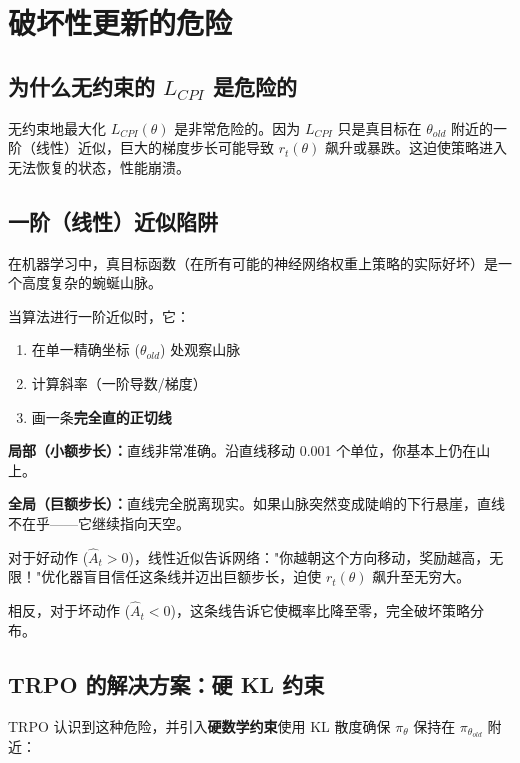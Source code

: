 \documentclass[12pt,a4paper]{article}
\theoremstyle{noteplain}
\theoremstyle{noteexercise}
\begin{document}
\section{破坏性更新的危险}\label{sec:danger}

\subsection{为什么无约束的 $L_{CPI}$ 是危险的}

无约束地最大化 $L_{CPI}(\theta)$ 是非常危险的。因为 $L_{CPI}$ 只是真目标在 $\theta_{old}$ 附近的一阶（线性）近似，巨大的梯度步长可能导致 $r_t(\theta)$ 飙升或暴跌。这迫使策略进入无法恢复的状态，性能崩溃。

\subsection{一阶（线性）近似陷阱}

在机器学习中，真目标函数（在所有可能的神经网络权重上策略的实际好坏）是一个高度复杂的蜿蜒山脉。

当算法进行一阶近似时，它：
\begin{enumerate}
  \setlength{\itemsep}{0.2em}
  \item 在单一精确坐标 ($\theta_{old}$) 处观察山脉
  \item 计算斜率（一阶导数/梯度）
  \item 画一条\textbf{完全直的正切线}
\end{enumerate}

\textbf{局部（小额步长）：}直线非常准确。沿直线移动 0.001 个单位，你基本上仍在山上。

\textbf{全局（巨额步长）：}直线完全脱离现实。如果山脉突然变成陡峭的下行悬崖，直线不在乎——它继续指向天空。

对于好动作 ($\hat{A}_t > 0$)，线性近似告诉网络："你越朝这个方向移动，奖励越高，无限！"优化器盲目信任这条线并迈出巨额步长，迫使 $r_t(\theta)$ 飙升至无穷大。

相反，对于坏动作 ($\hat{A}_t < 0$)，这条线告诉它使概率比降至零，完全破坏策略分布。

\subsection{TRPO 的解决方案：硬 KL 约束}

TRPO 认识到这种危险，并引入\textbf{硬数学约束}使用 KL 散度确保 $\pi_\theta$ 保持在 $\pi_{\theta_{old}}$ 附近：
\end{document}
